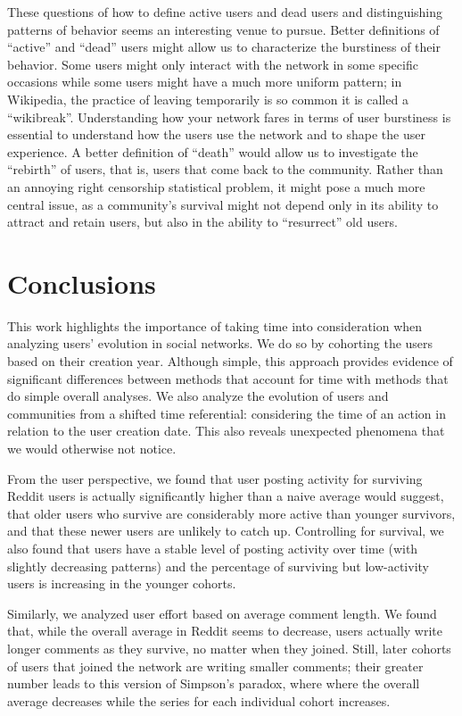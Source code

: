 These questions of how to define active users and dead users and distinguishing patterns of behavior seems an interesting venue to pursue. Better definitions of ``active'' and ``dead'' users might allow us to characterize the burstiness of their behavior.  Some users might only interact with the network in some specific occasions while some users might have a much more uniform pattern; in Wikipedia, the practice of leaving temporarily is so common it is called a ``wikibreak''. Understanding how your network fares in terms of user burstiness is essential to understand how the users use the network and to shape the user experience.  A better definition of ``death'' would allow us to investigate the ``rebirth'' of users, that is, users that come back to the community.  Rather than an annoying right censorship statistical problem, it might pose a much more central issue, as a community's survival might not depend only in its ability to attract and retain users, but also in the ability to ``resurrect'' old users. 

\section{Conclusions}

This work highlights the importance of taking time into consideration when analyzing users' evolution in social networks. We do so by cohorting the users based on their creation year. Although simple, this approach provides evidence of significant differences between methods that account for time with methods that do simple overall analyses.  We also analyze the evolution of users and communities from a shifted time referential: considering the time of an action in relation to the user creation date. This also reveals unexpected phenomena that we would otherwise not notice.

From the user perspective, we found that user posting activity for surviving Reddit users is actually significantly higher than a naive average would suggest, that older users who survive are considerably more active than younger survivors, and that these newer users are unlikely to catch up.   Controlling for survival, we also found that users have a stable level of posting activity over time (with slightly decreasing patterns) and the percentage of surviving but low-activity users is increasing in the younger cohorts.  

Similarly, we analyzed user effort based on average comment length. We found that, while the overall average in Reddit seems to decrease, users actually write longer comments as they survive, no matter when they joined.  Still, later cohorts of users that joined the network are writing smaller comments; their greater number leads to this version of Simpson's paradox, where where the overall average decreases while the series for each individual cohort increases. 

